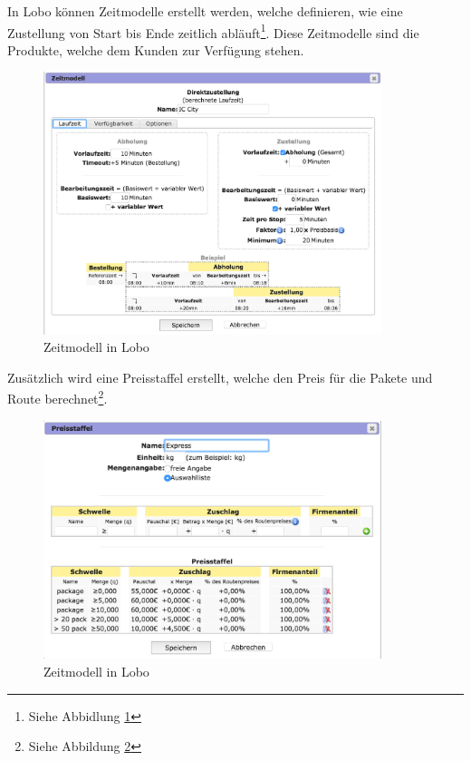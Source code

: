 In Lobo können Zeitmodelle erstellt werden, welche definieren, wie eine Zustellung von Start bis Ende zeitlich abläuft\footnote{Siehe Abbidlung \ref{fig1:lobozeitmodell}}. Diese Zeitmodelle sind die Produkte, welche dem Kunden zur Verfügung stehen.
\begin{figure}[ht]
	\centering
  \includegraphics[width=0.88\textwidth]{images/loboZeitmodell.png}
	\caption{Zeitmodell in Lobo}
	\label{fig1:lobozeitmodell}
\end{figure}
Zusätzlich wird eine Preisstaffel erstellt, welche den Preis für die Pakete und Route berechnet\footnote{Siehe Abbildung \ref{fig1:lobopreisstaffel}}.

\begin{figure}[ht]
	\centering
  \includegraphics[width=0.88\textwidth]{images/loboPreisstaffel.png}
	\caption{Zeitmodell in Lobo}
	\label{fig1:lobopreisstaffel}
\end{figure}


